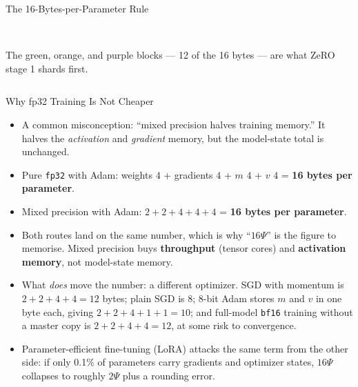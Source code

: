 \begin{frame}{The 16-Bytes-per-Parameter Rule}
\begin{columns}[T,onlytextwidth]
\\[0.6em]
      {\scriptsize The green, orange, and purple blocks --- 12 of the 16 bytes --- are what ZeRO stage 1 shards first.}
  \end{columns}
\end{frame}

\begin{frame}[allowframebreaks]{Why fp32 Training Is Not Cheaper}
  \begin{itemize}\itemsep0.45em
    \item[\textcolor{red}{$\blacktriangleright$}] A common misconception: ``mixed precision halves training memory.'' It halves the \emph{activation} and \emph{gradient} memory, but the model-state total is unchanged.
    \item[\textcolor{red}{$\blacktriangleright$}] Pure \texttt{fp32} with Adam: weights $4$ + gradients $4$ + $m$ $4$ + $v$ $4$ = \textbf{16 bytes per parameter}.
    \item[\textcolor{red}{$\blacktriangleright$}] Mixed precision with Adam: $2 + 2 + 4 + 4 + 4$ = \textbf{16 bytes per parameter}.
    \item[\textcolor{red}{$\blacktriangleright$}] Both routes land on the same number, which is why ``$16\Psi$'' is the figure to memorise. Mixed precision buys \textbf{throughput} (tensor cores) and \textbf{activation memory}, not model-state memory.
    \item[\textcolor{red}{$\blacktriangleright$}] What \emph{does} move the number: a different optimizer. SGD with momentum is $2+2+4+4 = 12$ bytes; plain SGD is $8$; 8-bit Adam stores $m$ and $v$ in one byte each, giving $2+2+4+1+1 = 10$; and full-model \texttt{bf16} training without a master copy is $2+2+4+4 = 12$, at some risk to convergence.
    \item[\textcolor{red}{$\blacktriangleright$}] Parameter-efficient fine-tuning (LoRA) attacks the same term from the other side: if only 0.1\% of parameters carry gradients and optimizer states, $16\Psi$ collapses to roughly $2\Psi$ plus a rounding error.
  \end{itemize}
\end{frame}

